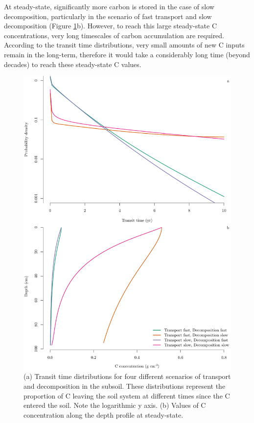 \documentclass[11pt, oneside, a4paper]{article}   	%
\begin{document}
At steady-state, significantly more carbon is stored in the case of slow decomposition, particularly in the scenario of fast transport and slow decomposition (Figure \ref{fig:transitTime}b). However, to reach this large steady-state C concentrations, very long timescales of carbon accumulation are required. According to the transit time distributions, very small amounts of new C inputs remain in the long-term, therefore it would take a considerably long time (beyond decades) to reach these steady-state C values. 

\begin{figure}[htbp]
   \centering
   \includegraphics[width=\textwidth]{Figures/transitTimes.pdf} %
   \caption{(a) Transit time distributions for four different scenarios of transport and decomposition in the subsoil. These distributions represent the proportion of C leaving the soil system at different times since the C entered the soil. Note the logarithmic y axis. (b) Values of C concentration along the depth profile at steady-state.}
   \label{fig:transitTime}
\end{figure}
\end{document}
